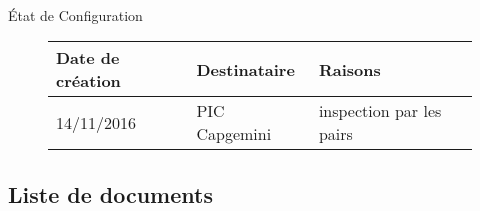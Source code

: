 \documentclass[asi, sansVersion]{picInsa}
\begin{document}
\begin{center}
\huge
\nomEquipe{}\\
État de Configuration\\
\end{center}
\vspace{0.5cm}


\begin{figure}[H]
		\centering
		\begin{tabularx}{17cm}{|p{4cm}|X|X|}
		\hline
		\rowcolor[gray]{0.85}Date de création & Destinataire & Raisons \\
		\hline
		14/11/2016 & PIC Capgemini & inspection par les pairs \\
		\hline
		\end{tabularx}
\end{figure}

\subsection*{Liste de documents}
\end{document}
